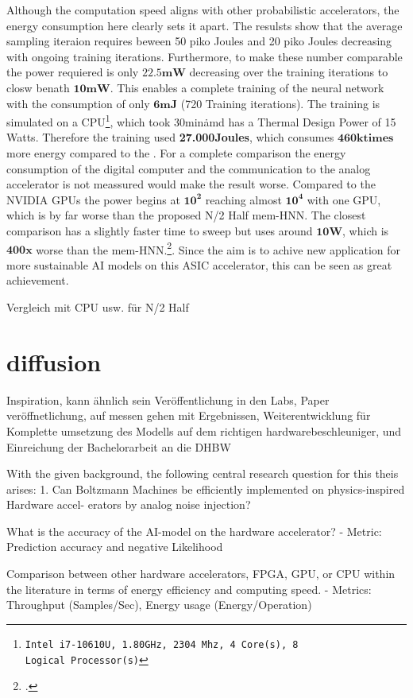 Although the computation speed aligns with other probabilistic accelerators, the energy consumption here clearly sets it apart.
The resulsts show that the average sampling iteraion requires beween 50 piko Joules and 20 piko Joules decreasing with ongoing training iterations.
Furthermore, to make these number comparable the power requiered is only \(\mathbf{22.5mW}\) decreasing over the training iterations to closw benath \(\mathbf{10mW}\).
This enables a complete training of the neural network with the consumption of only \(\mathbf{6 mJ}\) (720 Training iterations).
The training is simulated on a CPU\footnote{\texttt{Intel i7-10610U, 1.80GHz, 2304 Mhz, 4 Core(s), 8 Logical Processor(s)}}, which took 30min\. amd has a Thermal Design Power of 15 Watts.
Therefore the training used \textbf{27.000Joules}, which consumes \(\mathbf{460k times}\) more energy compared to the .
For a complete comparison the energy consumption of the digital computer and the communication to the analog accelerator is not meassured 
would make the result worse. Compared to the NVIDIA \ac{GPU}s the power begins at \(\mathbf{10^2}\) reaching almost \(\mathbf{10^4}\) with one \ac{GPU},
which is by far worse than the proposed N/2 Half \ac{mem-HNN}. The closest comparison has a slightly faster time to sweep
but uses around \(\mathbf{10W}\), which is \(\mathbf{400x}\) worse than the \ac{mem-HNN}.\footcite[cf.][2]{aaditAcceleratingAdaptiveParallel2023}.
Since the aim is to achive new application for more sustainable AI models on this \ac{ASIC} accelerator, 
this can be seen as great achievement.


Vergleich mit CPU usw. für N/2 Half
\section{diffusion}
Inspiration, kann ähnlich sein
Veröffentlichung in den Labs, Paper veröffnetlichung, auf messen gehen mit Ergebnissen,
Weiterentwicklung für Komplette umsetzung des Modells auf dem richtigen hardwarebeschleuniger,
und Einreichung der Bachelorarbeit an die DHBW

With the given background, the following central research question for this theis arises:
1. Can Boltzmann Machines be efficiently implemented on physics-inspired Hardware accel-
erators by analog noise injection?

 What is the accuracy of the AI-model on the hardware accelerator?
- Metric: Prediction accuracy and negative Likelihood

 Comparison between other hardware accelerators, FPGA, GPU, or CPU within the
literature in terms of energy efficiency and computing speed.
- Metrics: Throughput (Samples/Sec), Energy usage (Energy/Operation)